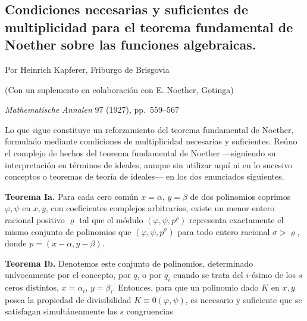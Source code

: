 \clearpage
\subsection*{Condiciones necesarias y suficientes de multiplicidad para el teorema fundamental de Noether sobre las funciones algebraicas.}\label{notwendige-und-hinreichende-multiplizitaetsbedingungen-zum-noetherschen-fundamentalsatz-der-algebraischen-funktionen}

\begin{center}
Por Heinrich Kapferer, Friburgo de Brisgovia

(Con un suplemento en colaboración con E. Noether, Gotinga)

\emph{Mathematische Annalen} 97 (1927), pp.~559--567
\end{center}

Lo que sigue constituye un reforzamiento del teorema fundamental de Noether, formulado mediante condiciones de multiplicidad necesarias y suficientes. Reúno el complejo de hechos del teorema fundamental de Noether ---siguiendo su interpretación en términos de ideales, aunque sin utilizar aquí ni en lo sucesivo conceptos o teoremas de teoría de ideales--- en los dos enunciados siguientes.

\textbf{Teorema Ia.} Para cada cero común $x=\alpha$, $y=\beta$ de dos polinomios coprimos $\varphi,\psi$ en $x,y$, con coeficientes complejos arbitrarios, existe un menor entero racional positivo $\varrho$ tal que el módulo $(\varphi,\psi,p^\varrho)$ representa exactamente el mismo conjunto de polinomios que $(\varphi,\psi,p^\sigma)$ para todo entero racional $\sigma>\varrho$, donde $p=(x-\alpha,y-\beta)$.

\textbf{Teorema Ib.} Denotemos este conjunto de polinomios, determinado unívocamente por el concepto, por $q$, o por $q_i$ cuando se trata del $i$-ésimo de los $s$ ceros distintos, $x=\alpha_i$, $y=\beta_i$. Entonces, para que un polinomio dado $K$ en $x,y$ posea la propiedad de divisibilidad $K\equiv0(\varphi,\psi)$, es necesario y suficiente que se satisfagan simultáneamente las $s$ congruencias

